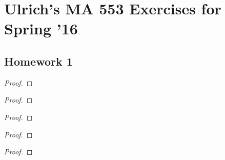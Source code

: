 \chapter{Ulrich's MA 553 Exercises for Spring '16}
\section{Homework 1}
\begin{exercise}
\end{exercise}
\begin{proof}
\end{proof}

\begin{exercise}
\end{exercise}
\begin{proof}
\end{proof}

\begin{exercise}
\end{exercise}
\begin{proof}
\end{proof}

\begin{exercise}
\end{exercise}
\begin{proof}
\end{proof}

\begin{exercise}
\end{exercise}
\begin{proof}
\end{proof}

